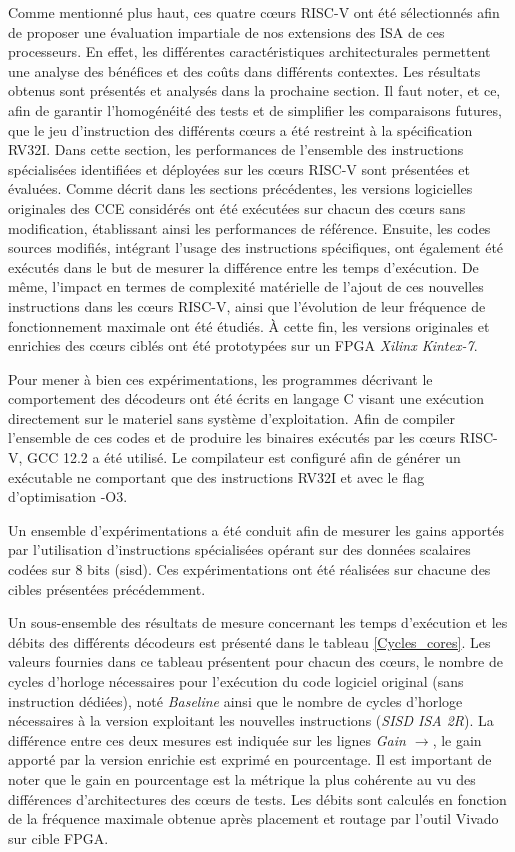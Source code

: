 \documentclass[../main.tex]{subfiles}
\begin{document}
Comme mentionné plus haut, ces quatre cœurs RISC-V ont été sélectionnés afin de proposer une évaluation impartiale de nos extensions des ISA de ces processeurs.
En effet, les différentes caractéristiques architecturales permettent une analyse des bénéfices et des coûts dans différents contextes. 
Les résultats obtenus sont présentés et analysés dans la prochaine section. Il faut noter, et ce, afin de garantir l'homogénéité des tests et de simplifier les comparaisons futures, que le jeu d'instruction des différents cœurs a été restreint à la spécification RV32I.
%
Dans cette section, les performances de l'ensemble des instructions spécialisées identifiées et déployées sur les cœurs RISC-V sont présentées et évaluées.
Comme décrit dans les sections précédentes, les versions logicielles originales des CCE considérés ont été exécutées sur chacun des cœurs sans modification, établissant ainsi les performances de référence. 
Ensuite, les codes sources modifiés, intégrant l'usage des instructions spécifiques, ont également été exécutés dans le but de mesurer la différence entre les temps d'exécution. De même, l'impact en termes de complexité matérielle de l'ajout de ces nouvelles instructions dans les cœurs RISC-V, ainsi que l'évolution de leur fréquence de fonctionnement maximale ont été étudiés. À cette fin, les versions originales et enrichies des cœurs ciblés ont été prototypées sur un FPGA \textit{Xilinx Kintex-7}. 

Pour mener à bien ces expérimentations, les programmes décrivant le comportement des décodeurs ont été écrits en langage C visant une exécution directement sur le materiel sans système d'exploitation. Afin de compiler l'ensemble de ces codes et de produire les binaires exécutés par les cœurs RISC-V, GCC 12.2 a été utilisé. Le compilateur est configuré afin de générer un exécutable ne comportant que des instructions RV32I et avec le flag d'optimisation -O3. 

Un ensemble d'expérimentations a été conduit afin de mesurer les gains apportés par l'utilisation d'instructions spécialisées opérant sur des données scalaires codées sur 8 bits (\acrshort{sisd}). Ces expérimentations ont été réalisées sur chacune des cibles présentées précédemment. 

Un sous-ensemble des résultats de mesure concernant les temps d'exécution et les débits des différents décodeurs est présenté dans le tableau \ref{Cycles_cores}.
Les valeurs fournies dans ce tableau présentent pour chacun des cœurs, le nombre de cycles d'horloge nécessaires pour l'exécution du code logiciel original (sans instruction dédiées), noté \textit{Baseline} ainsi que le nombre de cycles d'horloge nécessaires à la version exploitant les nouvelles instructions (\textit{SISD ISA 2R}). 
La différence entre ces deux mesures est indiquée sur les lignes \textit{Gain $\rightarrow$}, le gain apporté par la version enrichie est exprimé en pourcentage.
Il est important de noter que le gain en pourcentage est la métrique la plus cohérente au vu des différences d'architectures des cœurs de tests. Les débits sont calculés en fonction de la fréquence maximale obtenue après placement et routage par l'outil Vivado sur cible FPGA.
\end{document}
